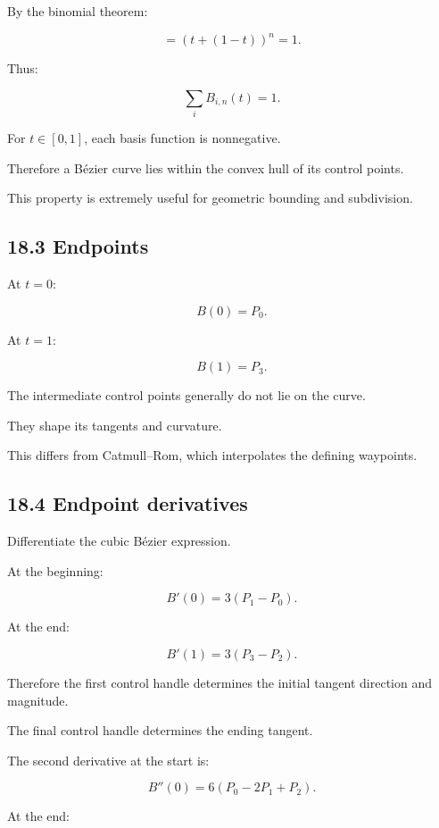 By the binomial theorem:

\[ =(t+(1-t))^n=1. \]

Thus:

\[ \boxed{ \sum_iB_{i,n}(t)=1 }. \]

For \(t\in[0,1]\), each basis function is nonnegative.

Therefore a Bézier curve lies within the convex hull of its control points.

This property is extremely useful for geometric bounding and subdivision.

\subsection{18.3 Endpoints}\label{02-foundations-ii-ch028-endpoints}

\hypertarget{02-foundations-ii-ch028-endpoints}{}

At \(t=0\):

\[ B(0)=P_0. \]

At \(t=1\):

\[ B(1)=P_3. \]

The intermediate control points generally do not lie on the curve.

They shape its tangents and curvature.

This differs from Catmull--Rom, which interpolates the defining waypoints.

\subsection{18.4 Endpoint derivatives}\label{02-foundations-ii-ch028-endpoint-derivatives}

\hypertarget{02-foundations-ii-ch028-endpoint-derivatives}{}

Differentiate the cubic Bézier expression.

At the beginning:

\[ \boxed{ B'(0)=3(P_1-P_0) }. \]

At the end:

\[ \boxed{ B'(1)=3(P_3-P_2) }. \]

Therefore the first control handle determines the initial tangent direction and magnitude.

The final control handle determines the ending tangent.

The second derivative at the start is:

\[ \boxed{ B''(0)=6(P_0-2P_1+P_2) }. \]

At the end:

